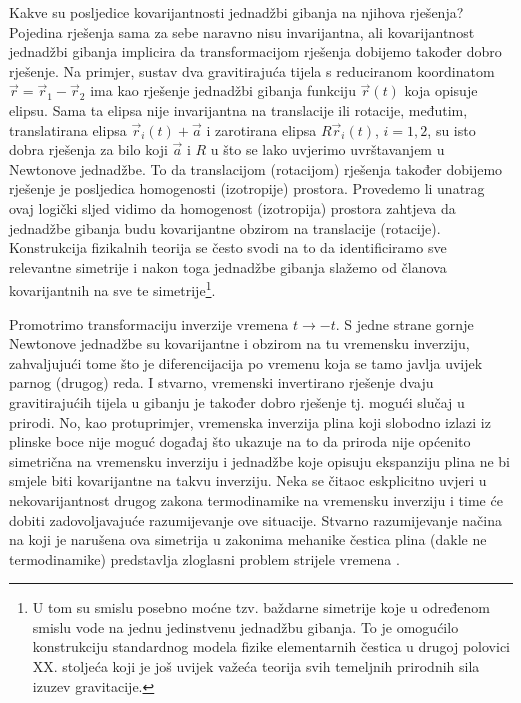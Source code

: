 Kakve su posljedice kovarijantnosti jednadžbi gibanja na njihova
rješenja?
Pojedina rješenja sama za sebe naravno nisu invarijantna, ali 
kovarijantnost jednadžbi gibanja implicira da transformacijom rješenja
dobijemo također dobro rješenje.
Na primjer, sustav dva gravitirajuća tijela s reduciranom koordinatom $\vec{r}
= \vec{r}_1 - \vec{r}_2$ ima kao
rješenje jednadžbi gibanja funkciju $\vec{r}(t)$ koja opisuje elipsu.
Sama ta elipsa nije invarijantna na translacije ili rotacije,
međutim, translatirana elipsa $\vec{r}_{i}(t)+\vec{a}$ i zarotirana
elipsa $R\vec{r}_{i}(t)$, $i=1, 2$, su isto dobra rješenja za bilo koji $\vec{a}$ i $R$
u što se lako uvjerimo uvrštavanjem u Newtonove jednadžbe.
To da translacijom (rotacijom) rješenja također dobijemo rješenje je posljedica
homogenosti (izotropije) prostora.
Provedemo li unatrag ovaj logički sljed vidimo da homogenost
(izotropija) prostora zahtjeva da jednadžbe gibanja budu kovarijantne
obzirom na translacije (rotacije). Konstrukcija fizikalnih teorija se
često svodi na to da identificiramo sve relevantne simetrije i nakon toga
jednadžbe gibanja slažemo od članova kovarijantnih na sve te simetrije\footnote{%
    U tom su smislu posebno moćne tzv. baždarne simetrije koje u
    određenom smislu vode na jednu jedinstvenu jednadžbu gibanja.
To je omogućilo konstrukciju standardnog modela fizike elementarnih čestica
u drugoj polovici XX. stoljeća koji je još uvijek važeća
teorija svih temeljnih prirodnih sila izuzev gravitacije.}.


\begin{primjer}
      
Promotrimo transformaciju inverzije vremena $t \to -t$.
S jedne strane gornje Newtonove jednadžbe su kovarijantne i obzirom na tu vremensku
inverziju, zahvaljujući tome što je diferencijacija po vremenu koja
se tamo javlja uvijek parnog (drugog) reda. 
I stvarno, vremenski invertirano rješenje dvaju gravitirajućih
tijela u gibanju je također dobro rješenje tj. mogući slučaj u prirodi.
No, kao protuprimjer, vremenska inverzija plina koji slobodno izlazi iz plinske boce nije
moguć događaj što ukazuje na to da priroda nije općenito simetrična na vremensku inverziju i
jednadžbe koje opisuju ekspanziju plina ne bi smjele biti kovarijantne
na takvu inverziju. Neka se čitaoc eskplicitno uvjeri u nekovarijantnost drugog
zakona termodinamike na vremensku inverziju i time će dobiti zadovoljavajuće
razumijevanje ove situacije. Stvarno razumijevanje načina na koji je narušena
ova simetrija u zakonima mehanike čestica plina (dakle ne termodinamike) 
predstavlja zloglasni problem strijele vremena \cite{Zeh:2007}.

\end{primjer}

